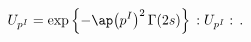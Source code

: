 \begin{equation}
U_{p^I}=\exp\left\{
-\ap \bigl(p^I\bigr)^2\,\Gamma(2s)
\right\}\,:U_{p^I}:\,.
\end{equation}

